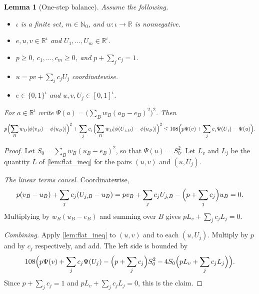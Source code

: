 \documentclass[11pt]{article}
\newtheorem{lemma}[theorem]{Lemma}
\theoremstyle{definition}
\theoremstyle{remark}
\newcommand{\R}{\mathbb{R}}
\newcommand{\Nz}{\mathbb{N}_0}
\begin{document}
\begin{lemma}[One-step balance]\label{lem:local_ineq}
Assume the following.
\begin{itemize}
\item $\iota$ is a finite set, $m\in\Nz$, and $w:\iota\to\R$ is nonnegative.
\item $e,u,v\in\R^\iota$ and $U_1,\dots,U_m\in\R^\iota$.
\item $p\ge0$, $c_1,\dots,c_m\ge0$, and $p+\sum_jc_j=1$.
\item $u=pv+\sum_jc_jU_j$ coordinatewise.
\item $e\in\{0,1\}^\iota$ and $u,v,U_j\in[0,1]^\iota$.
\end{itemize}
For $a\in\R^\iota$ write $\Psi(a)=\bigl(\sum_Bw_B(a_B-e_B)^2\bigr)^2$. Then
\[
p\Bigl(\sum_Bw_B|\phi(v_B)-\phi(u_B)|\Bigr)^2+\sum_jc_j\Bigl(\sum_Bw_B|\phi(U_{j,B})-\phi(u_B)|\Bigr)^2
\le108\Bigl(p\Psi(v)+\sum_jc_j\Psi(U_j)-\Psi(u)\Bigr).
\]
\end{lemma}
\begin{proof}
Let $S_0=\sum_Bw_B(u_B-e_B)^2$, so that $\Psi(u)=S_0^2$. Let $L_v$ and $L_j$ be the quantity $L$ of \cref{lem:flat_ineq} for the pairs $(u,v)$ and $(u,U_j)$.

\emph{The linear terms cancel.} Coordinatewise,
\[
p(v_B-u_B)+\sum_jc_j(U_{j,B}-u_B)=pv_B+\sum_jc_jU_{j,B}-\Bigl(p+\sum_jc_j\Bigr)u_B=0 .
\]
Multiplying by $w_B(u_B-e_B)$ and summing over $B$ gives $pL_v+\sum_jc_jL_j=0$.

\emph{Combining.} Apply \cref{lem:flat_ineq} to $(u,v)$ and to each $(u,U_j)$. Multiply by $p$ and by $c_j$ respectively, and add. The left side is bounded by
\[
108\Bigl(p\Psi(v)+\sum_jc_j\Psi(U_j)-\Bigl(p+\sum_jc_j\Bigr)S_0^2-4S_0\Bigl(pL_v+\sum_jc_jL_j\Bigr)\Bigr).
\]
Since $p+\sum_jc_j=1$ and $pL_v+\sum_jc_jL_j=0$, this is the claim.
\end{proof}
\end{document}
